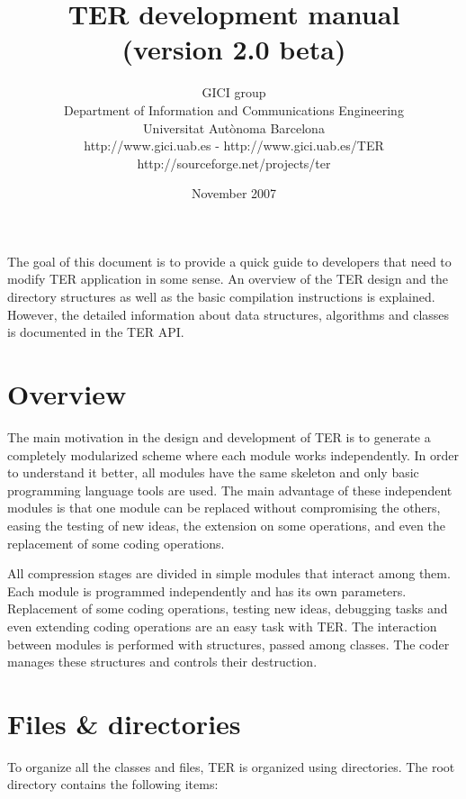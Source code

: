 \documentclass[a4paper,10pt]{article}
\title{TER development manual \\ \small (version 2.0 beta)}
\author{
GICI group \vspace{0.1cm} \\
\small Department of Information and Communications Engineering \\
\small Universitat Aut{\`o}noma Barcelona \\
\small http://www.gici.uab.es  -  http://www.gici.uab.es/TER \\
\small http://sourceforge.net/projects/ter
}
\date{November 2007}
\begin{document}
\maketitle

	The goal of this document is to provide a quick guide to developers
	that need to modify TER application in some sense. An overview of
	the TER design and the directory structures as well as the basic
	compilation instructions is explained. However, the detailed
	information about data structures, algorithms and classes is
	documented in the TER API. 

\section{Overview}
\label{sect:overview}

	The main motivation in the design and development of TER is to
	generate a completely modularized scheme where each module works
	independently. In order to understand it better, all modules have
	the same skeleton and only basic programming language tools are
	used. The main advantage of these independent modules is that one
	module can be replaced without compromising the others, easing the
	testing of new ideas, the extension on some operations, and even
	the replacement of some coding operations. 

	All compression stages are divided in simple modules that interact
	among them. Each module is programmed independently and has its own
	parameters. Replacement of some coding operations, testing new
	ideas, debugging tasks and even extending coding operations are an
	easy task with TER. The interaction between modules is performed
	with structures, passed among classes. The coder manages these
	structures and controls their destruction. 


\section{Files \& directories}
\label{sect:files}

	To organize all the classes and files, TER is organized using 
	directories. The root directory contains the following items: 
\end{document}
